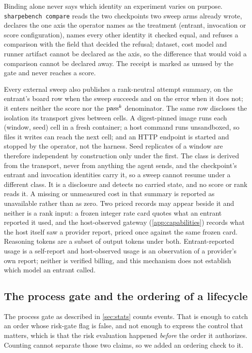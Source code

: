 Binding alone never says which identity an experiment varies on purpose. \texttt{sharpebench compare} reads the two checkpoints two sweep arms already wrote, declares the one axis the operator names as the treatment (entrant, invocation or score configuration), names every other identity it checked equal, and refuses a comparison with the field that decided the refusal; dataset, cost model and runner artifact cannot be declared as the axis, so the difference that would void a comparison cannot be declared away. The receipt is marked as unused by the gate and never reaches a score.

Every external sweep also publishes a rank-neutral attempt summary, on the entrant's board row when the sweep succeeds and on the error when it does not; it enters neither the score nor the $\text{pass}^{k}$ denominator. The same row discloses the isolation its transport gives between cells. A digest-pinned image runs each (window, seed) cell in a fresh container; a host command runs unsandboxed, so files it writes can reach the next cell; and an HTTP endpoint is started and stopped by the operator, not the harness. Seed replicates of a window are therefore independent by construction only under the first. The class is derived from the transport, never from anything the agent sends, and the checkpoint's entrant and invocation identities carry it, so a sweep cannot resume under a different class. It is a disclosure and detects no carried state, and no score or rank reads it. A missing or unmeasured cost in that summary is reported as unavailable rather than as zero. Two priced records may appear beside it and neither is a rank input: a frozen integer rate card quotes what an entrant reported it used, and the host-observed gateway (\cref{app:capabilities}) records what the host itself saw a provider report, priced once against the same frozen card. Reasoning tokens are a subset of output tokens under both. Entrant-reported usage is a self-report and host-observed usage is an observation of a provider's own report; neither is verified billing, and this mechanism does not establish which model an entrant called.

\subsection{The process gate and the ordering of a lifecycle}\label{sec:lifecycle}

The process gate as described in \cref{sec:stats} counts events. That is enough to catch an order whose risk-gate flag is false, and not enough to express the control that matters, which is that the risk evaluation happened \emph{before} the order it authorizes. Counting cannot separate those two claims, so we added an ordering check to it.


